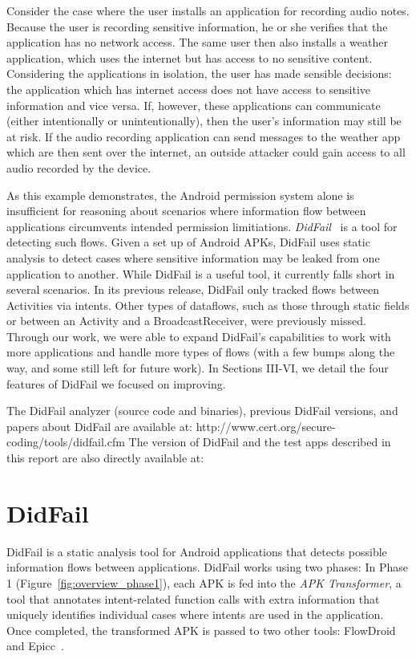 Consider the case where the user installs an application for recording audio notes. Because the user is recording sensitive information, he or she verifies that the application has no network access. The same user then also installs a weather application, which uses the internet but has access to no sensitive content. Considering the applications in isolation, the user has made sensible decisions: the application which has internet access does not have access to sensitive information and vice versa. If, however, these applications can communicate (either intentionally or unintentionally), then the user's information may still be at risk. If the audio recording application can send messages to the weather app which are then sent over the internet, an outside attacker could gain access to all audio recorded by the device.

As this example demonstrates, the Android permission system alone is insufficient for reasoning about scenarios where information flow between applications circumvents intended permission limitiations. \emph{DidFail}~\cite{didfail} is a tool for detecting such flows. Given a set up of Android APKs, DidFail uses static analysis to detect cases where sensitive information may be leaked from one application to another. While DidFail is a useful tool, it currently falls short in several scenarios. In its previous release, DidFail only tracked flows between Activities via intents. Other types of dataflows, such as those through static fields or between an Activity and a BroadcastReceiver, were previously missed. Through our work, we were able to expand DidFail's capabilities to work with more applications and handle more types of flows (with a few bumps along the way, and some still left for future work). In Sections III-VI, we detail the four features of DidFail we focused on improving.

The DidFail analyzer (source code and binaries), previous DidFail versions, and papers about DidFail are available at: http://www.cert.org/secure-coding/tools/didfail.cfm  The version of DidFail and the test apps described in this report are also directly available at: 

\chapter{DidFail}

DidFail is a static analysis tool for Android applications that detects possible information flows between applications. DidFail works using two phases: In Phase 1 (Figure~\ref{fig:overview_phase1}), each APK is fed into the \emph{APK Transformer}, a tool that annotates intent-related function calls with extra information that uniquely identifies individual cases where intents are used in the application. Once completed, the transformed APK is passed to two other tools: FlowDroid~\cite{flowdroid} and Epicc~\cite{epicc}.

